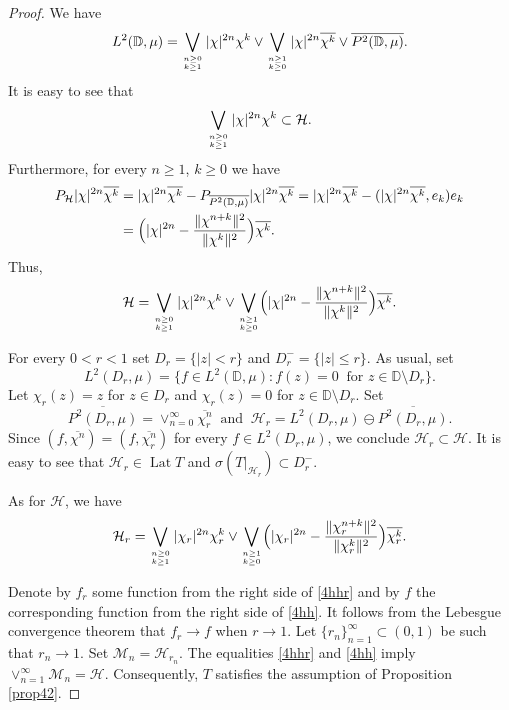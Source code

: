 \documentclass[a4paper,oneside,11pt]{amsart}
\numberwithin{equation}{section}
\theoremstyle{plain}
\theoremstyle{definition}
\begin{document}
\begin{proof}
We have
 \begin{equation*} L^2(\mathbb D,\mu)= 
\bigvee_{n\geq 0\atop k\geq 1}|\chi|^{2n}\chi^k\vee \bigvee_{n\geq 1\atop k\geq 0}|\chi|^{2n}\overline{\chi^k}
\vee \overline{P^2(\mathbb D,\mu)}.
\end{equation*}
It is easy to see that
\begin{equation*} \bigvee_{n\geq 0 \atop k\geq 1}|\chi|^{2n}\chi^k\subset\mathcal H.  
\end{equation*}
Furthermore, for every $n\geq 1$, $k\geq 0$ we have 
\begin{align*} P_{\mathcal H}|\chi|^{2n} \overline{\chi^k}&=|\chi|^{2n} \overline{\chi^k}
-P_{\overline{P^2(\mathbb D,\mu)}}|\chi|^{2n}\overline{\chi^k}=
 |\chi|^{2n} \overline{\chi^k}-(|\chi|^{2n} \overline{\chi^k}, e_k)e_k\\&
=\Bigl(|\chi|^{2n}-\frac{\|\chi^{n+k}\|^2}{\|\chi^k\|^2}\Bigr)\overline{\chi^k}. 
\end{align*}
Thus, 
\begin{equation}\label{4hh} \mathcal H=\bigvee_{n\geq 0\atop k\geq 1}|\chi|^{2n}\chi^k\vee 
\bigvee_{n\geq 1\atop k\geq 0}\Bigl(|\chi|^{2n}-\frac{\|\chi^{n+k}\|^2}{\|\chi^k\|^2}\Bigr)\overline{\chi^k}.
\end{equation}


For every $0<r<1$ set $D_r=\{|z|< r\}$ and $D_r^-=\{|z|\leq r\}$. As usual, set  
  \begin{equation*} L^2(D_r,\mu)=\{f\in L^2(\mathbb D,\mu)\colon f(z)=0 \ \text{ for } z\in \mathbb D\setminus D_r\}. 
\end{equation*}
Let   $\chi_r(z)=z$ for $z\in D_r$ and $\chi_r(z)=0$ for $z\in \mathbb D\setminus D_r$. 
 Set 
 \begin{equation*}\overline{P^2(D_r,\mu)}=\vee_{n=0}^\infty\overline{\chi_r^n}
 \ \text{ and } \ \mathcal H_r=L^2(D_r,\mu)\ominus\overline{P^2(D_r,\mu)}.
\end{equation*}
Since $(f,\overline{\chi^n})=(f,\overline{\chi_r^n})$ for every $f\in L^2(D_r,\mu)$, 
we conclude $\mathcal H_r\subset \mathcal H$. It is easy to see that 
  $\mathcal H_r\in\operatorname{Lat}T$ and $\sigma(T|_{\mathcal H_r})\subset D_r^-$. 

As for $\mathcal H$, we have  
\begin{equation}\label{4hhr} \mathcal H_r=\bigvee_{n\geq 0\atop k\geq 1}|\chi_r|^{2n}\chi_r^k\vee 
\bigvee_{n\geq 1\atop k\geq 0}\Bigl(|\chi_r|^{2n}-\frac{\|\chi_r^{n+k}\|^2}{\|\chi_r^k\|^2}\Big)\overline{\chi_r^k}.
\end{equation}

Denote by $f_r$ some function from the right side of \eqref{4hhr} and by $f$ the corresponding function 
 from the right side of \eqref{4hh}. It follows from the Lebesgue convergence theorem that $f_r\to f$ when $r\to 1$. 
Let $\{r_n\}_{n=1}^\infty\subset (0,1)$  be such that $r_n\to 1$. Set $\mathcal M_n=\mathcal H_{r_n}$. 
The equalities \eqref{4hhr} and  \eqref{4hh} imply $\vee_{n=1}^\infty\mathcal  M_n=\mathcal H $. 
Consequently, $T$ satisfies the assumption of Proposition \ref{prop42}.
\end{proof}
\end{document}
